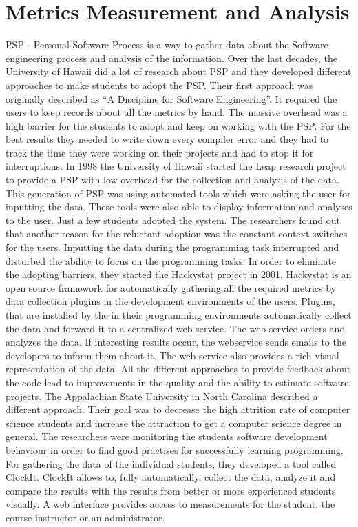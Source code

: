 \section{Metrics Measurement and Analysis}
PSP - Personal Software Process is a way to gather data about the Software engineering process and analysis of the information.
Over the last decades, the University of Hawaii did a lot of research about PSP and they developed different approaches to make students to adopt the PSP.
Their first approach was originally described as “A Discipline for Software Engineering”. It required the users to keep records about all the metrics by hand. The massive overhead was a high barrier for the students to adopt and keep on working with the PSP. For the best results they needed to write down every compiler error and they had to track the time they were working on their projects and had to stop it for interruptions. 
In 1998 the University of Hawaii started the Leap research project to provide a PSP with low overhead for the collection and analysis of the data. This generation of PSP was using automated tools which were asking the user for inputting the data. These tools were also able to display information and analyses to the user.
Just a few students adopted the system. The researchers found out that another reason for the reluctant adoption was the constant context switches for the users. Inputting the data during the programming task interrupted and disturbed the ability to focus on the programming tasks. \cite{johnson2003beyond}
In order to eliminate the adopting barriers, they started the Hackystat project in 2001. Hackystat is an open source framework for automatically gathering all the required metrics by data collection plugins in the development environments of the users. 
Plugins, that are installed by the in their programming environments automatically collect the data and forward it to a centralized web service. The web service orders and analyzes the data. If interesting results occur, the webservice sends emails to the developers to inform them about it. The web service also provides a rich visual representation of the data.
All the different approaches to provide feedback about the code lead to improvements in the quality and the ability to estimate software projects. \cite{johnson2001project} 
The Appalachian State University in North Carolina described a different approach. Their goal was to decrease the high attrition rate of computer science students and increase the attraction to get a computer science degree in general.
The researchers were monitoring the students software development behaviour in order to find good practises for successfully learning programming. For gathering the data of the individual students, they developed a tool called ClockIt. ClockIt allows to, fully automatically, collect the data, analyze it and compare the results with the results from better or more experienced students visually. A web interface provides access to measurements for the student, the course instructor or an administrator.
